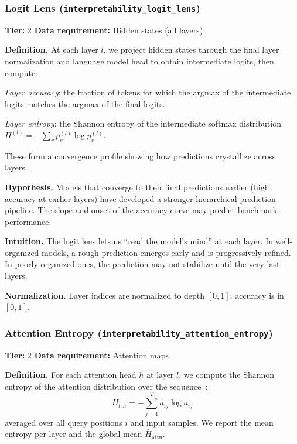 \documentclass[preprint]{neurips_2025}
\begin{document}
\subsubsection{Logit Lens (\texttt{interpretability\_logit\_lens})}
\label{app:logit-lens}

\textbf{Tier:} 2 \quad \textbf{Data requirement:} Hidden states (all layers)

\textbf{Definition.}
At each layer $l$, we project hidden states through the final layer normalization and language model head to obtain intermediate logits, then compute:

\emph{Layer accuracy}: the fraction of tokens for which the argmax of the intermediate logits matches the argmax of the final logits.

\emph{Layer entropy}: the Shannon entropy of the intermediate softmax distribution $H^{(l)} = -\sum_v p_v^{(l)} \log p_v^{(l)}$.

These form a convergence profile showing how predictions crystallize across layers~\citep{nostalgebraist2020logitlens}.

\textbf{Hypothesis.}
Models that converge to their final predictions earlier (high accuracy at earlier layers) have developed a stronger hierarchical prediction pipeline. The slope and onset of the accuracy curve may predict benchmark performance.

\textbf{Intuition.}
The logit lens lets us ``read the model's mind'' at each layer. In well-organized models, a rough prediction emerges early and is progressively refined. In poorly organized ones, the prediction may not stabilize until the very last layers.

\textbf{Normalization.} Layer indices are normalized to depth $[0, 1]$; accuracy is in $[0, 1]$.

\subsubsection{Attention Entropy (\texttt{interpretability\_attention\_entropy})}
\label{app:attn-entropy}

\textbf{Tier:} 2 \quad \textbf{Data requirement:} Attention maps

\textbf{Definition.}
For each attention head $h$ at layer $l$, we compute the Shannon entropy of the attention distribution over the sequence~\citep{clark2019what}:
\begin{equation}
  H_{l,h} = -\sum_{j=1}^{T} a_{ij} \log a_{ij}
\end{equation}
averaged over all query positions $i$ and input samples. We report the mean entropy per layer and the global mean $\bar{H}_{\text{attn}}$.
\end{document}
